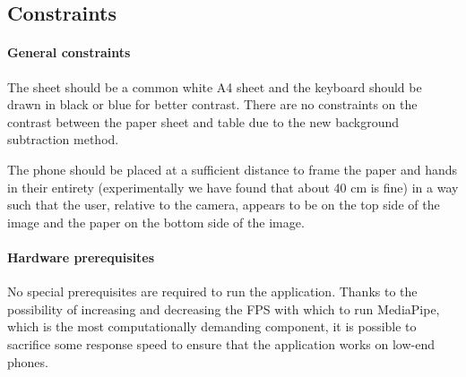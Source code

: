 \subsection{Constraints}\label{subsec:constraints}

\paragraph{General constraints}
The sheet should be a common white A4 sheet and the keyboard should be drawn in black or blue for better contrast.
There are no constraints on the contrast between the paper sheet and table due to the new background subtraction method.

The phone should be placed at a sufficient distance to frame the paper and hands in their entirety (experimentally
we have found that about 40 cm is fine) in a way such that the user, relative to the camera, appears to be on the top side
of the image and the paper on the bottom side of the image.

\paragraph{Hardware prerequisites}
No special prerequisites are required to run the application.
Thanks to the possibility of increasing and decreasing the FPS with which to run MediaPipe,
which is the most computationally demanding component,
it is possible to sacrifice some response speed to ensure that the application works on low-end phones.




